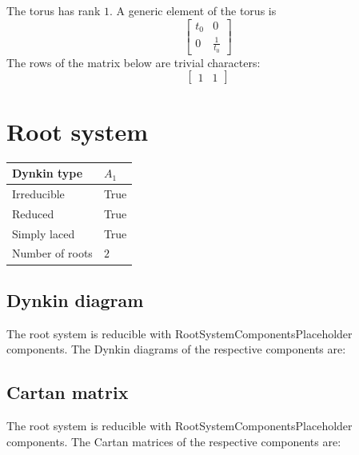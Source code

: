 \documentclass[11pt]{article}
\theoremstyle{definition}
\newif\ifrootsystemirreducible
\begin{document}
The torus has rank $1$. A generic element of the torus is
\[
\left[\begin{matrix}t_{0} & 0\\0 & \frac{1}{t_{0}}\end{matrix}\right]
\]
The rows of the matrix below are trivial characters:
\[
\left[\begin{matrix}1 & 1\end{matrix}\right]
\]

\newpage
\section{Root system}

\begin{tabular}{|l|l|}
	\hline
    Dynkin type & $A_1$ \\
	\hline
    Irreducible & True \\
	\hline
    Reduced & True \\
	\hline
	Simply laced & True \\
	\hline
	Number of roots & $2$ \\
	\hline
\end{tabular}

\subsection{Dynkin diagram}

\ifrootsystemirreducible
The root system is irreducible and has Dynkin diagram:
\else
The root system is reducible with RootSystemComponentsPlaceholder components. The Dynkin diagrams of the respective components are:
\fi


\subsection{Cartan matrix}

\ifrootsystemirreducible
The root system is irreducible and has Cartan matrix:
\else
The root system is reducible with RootSystemComponentsPlaceholder components. The Cartan matrices of the respective components are:
\fi
\end{document}
